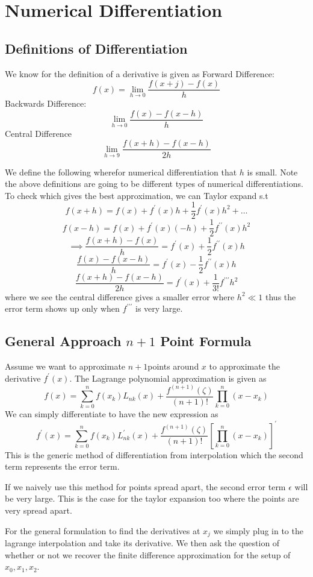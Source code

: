 \chapter{Numerical Differentiation}
\section{Definitions of Differentiation}
\begin{definition}
    We know for the definition of a derivative is given as 
    Forward Difference:
    \[
        f(x) = \lim_{h \to 0} \frac{f(x+j) - f(x)}{h}
    \]    
    Backwards Difference:
    \[
        \lim_{h \to 0} \frac{f(x) - f(x-h)}{h}
    \]
    Central Difference
    \[
        \lim_{h \to 9}  \frac{f(x+h) - f(x-h)}{2h}
    \]
\end{definition}
We define the following wherefor numerical differentiation that \(h\) is small. Note the above definitions are going to be different types 
of numerical differentiations. To check which gives the best approximation, we can Taylor expand s.t 
\[
    f(x+h) = f(x) + f^{\prime} (x) h + \frac{1}{2 } f^{\prime} (x) h^{2} +\dots 
\]
\[
    f(x-h) =  f(x) + f^{\prime} (x)(-h) + \frac{1}{2} f^{\prime\prime} (x) h^{2} 
\]
\[
    \implies \frac{f(x+h)-f(x)}{h} = f^{\prime} (x) +\frac{1}{2}f^{\prime\prime} (x) h
\]
\[
    \frac{f(x) - f(x-h)}{h} = f^{\prime} (x) - \frac{1}{2}f^{\prime\prime} (x) h 
\]
\[
    \frac{f(x+h)-f(x-h)}{2h} = f^{\prime} (x) + \frac{1}{3!} f^{\prime\prime\prime} h^{2} 
\]
where we see the central difference gives a smaller error where \(h^{2} \ll 1\) thus the error term shows up only when 
\(f^{\prime\prime\prime} \) is very large. 

\section{General Approach \(n+1\) Point Formula}
Assume we want to approximate \(n+1\)points around \(x\) to approximate the derivative \(f^{\prime} (x)\). The Lagrange polynomial approximation is given as 
\[
    f(x) = \sum_{k=0}^{n} f(x_k) L_{nk} (x) + \frac{f^{(n+1)} (\zeta)}{(n+1)!} \prod_{k=0}^n (x-x_k)
\]   
We can simply differentiate to have the new expression as 
\[
    f^{\prime} (x) = \sum_{k=0}^{n} f(x_k) L^{\prime} _{nk} (x) + \frac{f^{(n+1)} (\zeta)}{(n+1)!}  \left[ \prod_{k=0}^n (x-x_k) \right]^{\prime} 
\]
This is the generic method of differentiation from interpolation which the second term represents the error term. 
\begin{remark}
    If we naively use this method for points spread apart, the second error term \(\epsilon \) will be very large. This is the case for the 
    taylor expansion too where the points are very spread apart. 
\end{remark}
For the general formulation to find the derivatives at \(x_j\) we simply plug in to the lagrange interpolation and take its derivative. We then ask the question
of whether or not we recover the finite difference approximation for the setup of \(x_0, x_1, x_2\). 


